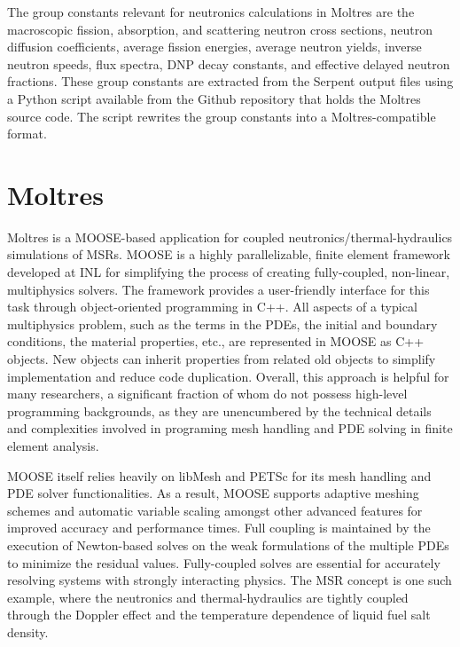 The group constants relevant for neutronics calculations in Moltres are the
macroscopic fission, absorption, and scattering neutron cross sections,
neutron diffusion coefficients, average fission energies, average neutron
yields, inverse neutron speeds, flux spectra, \gls{DNP} decay constants, and
effective delayed neutron fractions. These group constants are extracted from
the Serpent output files using a Python script available from the Github
repository that holds the Moltres source code. The script rewrites the group
constants into a Moltres-compatible format.

\section{Moltres}

Moltres is a \gls{MOOSE}-based application for coupled
neutronics/thermal-hydraulics simulations of \glspl{MSR}. \gls{MOOSE}
\cite{gaston_physics-based_2015} is a highly parallelizable,
finite element framework developed at \gls{INL} for simplifying the process of
creating fully-coupled, non-linear, multiphysics solvers. The framework
provides a user-friendly interface for this task through object-oriented
programming in C++. All aspects of a typical multiphysics problem, such as the
terms in the \glspl{PDE}, the initial and boundary conditions, the material
properties, etc., are represented in \gls{MOOSE} as C++ objects. New objects
can inherit properties from related old objects to simplify implementation and
reduce code duplication. Overall, this approach
is helpful for many researchers, a significant fraction of whom do not possess
high-level programming backgrounds, as they are unencumbered by the
technical details and complexities involved in programing mesh handling
and \gls{PDE} solving in finite element analysis.

\gls{MOOSE} itself relies heavily on libMesh \cite{kirk_libmesh:_2006} and
PETSc \cite{satish_petsc_2019} for its mesh handling and \gls{PDE} solver
functionalities. As a result, \gls{MOOSE} supports adaptive meshing schemes
and automatic variable scaling amongst other advanced features for improved
accuracy and performance times. Full
coupling is maintained by the execution of Newton-based solves on the
weak formulations of the multiple \glspl{PDE} to minimize the residual values.
Fully-coupled solves are essential for accurately resolving systems with
strongly interacting physics. The \gls{MSR} concept is one such example, where
the neutronics and thermal-hydraulics are tightly coupled through the Doppler
effect and the temperature dependence of liquid fuel salt density.

